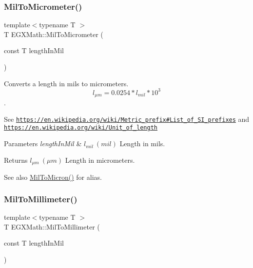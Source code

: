 \subsubsection{\texorpdfstring{Mil\+To\+Micrometer()}{MilToMicrometer()}}
{\footnotesize\ttfamily template$<$typename T $>$ \\
T E\+G\+X\+Math\+::\+Mil\+To\+Micrometer (\begin{DoxyParamCaption}\item[{const T}]{length\+In\+Mil }\end{DoxyParamCaption})}



Converts a length in mils to micrometers. \[ l_{\mu m}=0.0254* l_{mil} * 10^{3} \]. 

See \href{https://en.wikipedia.org/wiki/Metric_prefix#List_of_SI_prefixes}{\tt https\+://en.\+wikipedia.\+org/wiki/\+Metric\+\_\+prefix\#\+List\+\_\+of\+\_\+\+S\+I\+\_\+prefixes} and \href{https://en.wikipedia.org/wiki/Unit_of_length}{\tt https\+://en.\+wikipedia.\+org/wiki/\+Unit\+\_\+of\+\_\+length} 
\begin{DoxyParams}{Parameters}
{\em length\+In\+Mil} & $ l_{mil}\ (mil)$ Length in mils. \\
\hline
\end{DoxyParams}
\begin{DoxyReturn}{Returns}
$ l_{\mu m}\ (\mu m)$ Length in micrometers. 
\end{DoxyReturn}
\begin{DoxySeeAlso}{See also}
\mbox{\hyperlink{group___e_g_x_math-_conversions-_length_conversions-_imperial-_mil-_non-_s_i_gab38b772b1b070729756dcdc87826f5d0}{Mil\+To\+Micron()}} for alias. 
\end{DoxySeeAlso}
\mbox{\label{group___e_g_x_math-_conversions-_length_conversions-_imperial-_mil-_s_i_ga4abb75e6d0019b3a06c9912cfcdb9775}} 
\subsubsection{\texorpdfstring{Mil\+To\+Millimeter()}{MilToMillimeter()}}
{\footnotesize\ttfamily template$<$typename T $>$ \\
T E\+G\+X\+Math\+::\+Mil\+To\+Millimeter (\begin{DoxyParamCaption}\item[{const T}]{length\+In\+Mil }\end{DoxyParamCaption})}



